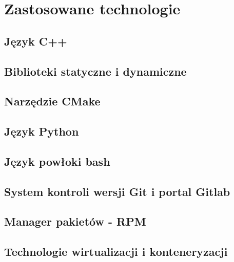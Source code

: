 \chapter{Zastosowane technologie}
\label{cha:teoria}

\section{Język C++}
\section{Biblioteki statyczne i dynamiczne}
\section{Narzędzie CMake}
\section{Język Python}
\section{Język powłoki bash}
\section{System kontroli wersji Git i portal Gitlab}
\section{Manager pakietów - RPM}
\section{Technologie wirtualizacji i konteneryzacji}

